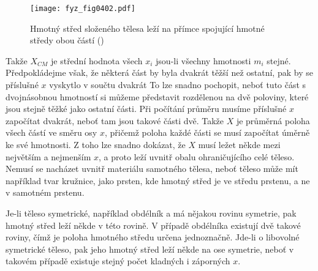     \begin{figure}[ht!] %
      \centering
      \texttt{[image: fyz\_fig0402.pdf]}
      \caption{Hmotný střed složeného tělesa leží na přímce spojující hmotné středy obou částí
              (\cite[s.~260]{Feynman01})}
      \label{fyz:fig0402}
    \end{figure}

    Takže \(X_{CM}\) je střední hodnota všech \(x_i\) jsou-li všechny hmotnosti \(m_i\) stejné.
    Předpokládejme však, že některá část by byla dvakrát těžší než ostatní, pak by se příslušné
    \(x\) vyskytlo v součtu dvakrát To lze snadno pochopit, neboť tuto část s dvojnásobnou hmotností
    si můžeme představit rozdělenou na dvě poloviny, které jsou stejně těžké jako ostatní části. Při
    počítání průměru musíme příslušné \(x\) započítat dvakrát, neboť tam jsou takové části dvě.
    Takže \(X\) je průměrná poloha všech částí ve směru osy \(x\), přičemž poloha každé části se
    musí započítat úměrně ke své hmotnosti. Z toho lze snadno dokázat, že \(X\) musí ležet někde
    mezi největším a nejmenším \(x\), a proto leží uvnitř obalu ohraničujícího celé těleso. Nemusí
    se nacházet uvnitř materiálu samotného tělesa, neboť těleso může mít například tvar kružnice,
    jako prsten, kde hmotný střed je ve středu prstenu, a ne v samotném prstenu.

    Je-li těleso symetrické, například obdélník a má nějakou rovinu symetrie, pak hmotný střed leží
    někde v této rovině. V případě obdélníka existují dvě takové roviny, čímž je poloha hmotného
    středu určena jednoznačně. Jde-li o libovolné symetrické těleso, pak jeho hmotný střed leží
    někde na ose symetrie, neboť v takovém případě existuje stejný počet kladných i záporných \(x\).

